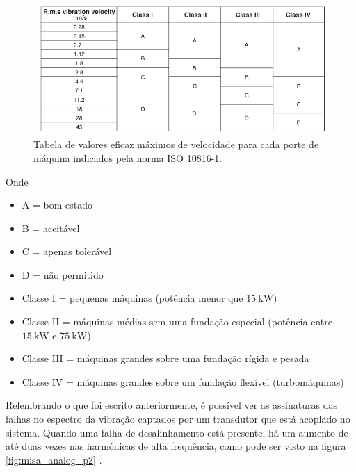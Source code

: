 \begin{figure}[H]
    \caption{Tabela de valores eficaz máximos de velocidade para cada porte de máquina indicados pela norma ISO 10816-1.}
    \begin{center}
        \includegraphics[scale=.5]{referencial/img/iso10816-1_randall_p146.png}
    \end{center}
    \label{fig:iso10816-1_randall_p146}
\end{figure}

Onde

\begin{itemize}
    \item A = bom estado
    \item B = aceitável
    \item C = apenas tolerável
    \item D = não permitido
    \item Classe I = pequenas máquinas (potência menor que $\SI{15}{\kilo\watt}$)
    \item Classe II = máquinas médias sem uma fundação especial (potência entre $\SI{15}{\kilo\watt}$ e $\SI{75}{\kilo\watt}$)
    \item Classe III = máquinas grandes sobre uma fundação rígida e pesada
    \item Classe IV = máquinas grandes sobre um fundação flexível (turbomáquinas) 
\end{itemize}

Relembrando o que foi escrito anteriormente, é possível ver as assinaturas das falhas no espectro da vibração captados por um transdutor
que está acoplado no sistema. Quando uma falha de desalinhamento está presente, há um aumento de até duas vezes nas harmónicas de alta 
frequência, como pode ser visto na figura \ref{fig:misa_analog_p2} \cite{Sopcik2019}.

